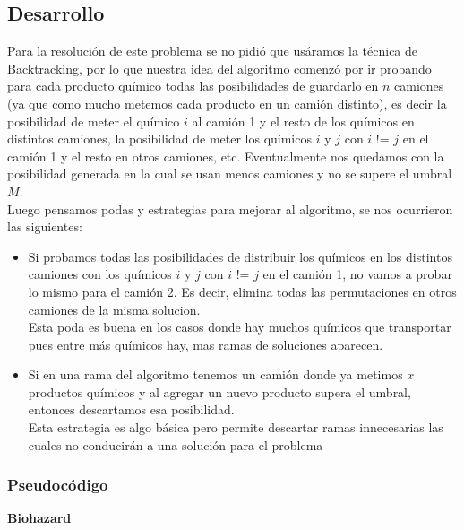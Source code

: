 \subsection{Desarrollo}


Para la resolución de este problema se no pidió que usáramos la técnica de Backtracking, por lo que nuestra idea del algoritmo comenzó por ir probando para cada producto químico todas las posibilidades de guardarlo en $n$ camiones (ya que como mucho metemos cada producto en un camión distinto), es decir la posibilidad de meter el químico $i$ al camión 1 y el resto de los químicos en distintos camiones, la posibilidad de meter los químicos $i$ y $j$ con $i$ != $j$ en el camión 1 y el resto en otros camiones, etc. Eventualmente nos quedamos con la posibilidad generada en la cual se usan menos camiones y no se supere el umbral $M$. \\
Luego pensamos podas y estrategias para mejorar al algoritmo, se nos ocurrieron las siguientes: 

\begin{itemize}
	\item Si probamos todas las posibilidades de distribuir los químicos en los distintos camiones con los químicos $i$ y $j$ con $i$ != $j$ en el camión 1, no vamos a probar lo mismo para el camión 2. Es decir, elimina todas las permutaciones en otros camiones de la misma solucion. \\
	Esta poda es buena en los casos donde hay muchos químicos que transportar pues entre más químicos hay, mas ramas de soluciones aparecen.
	
	\item Si en una rama del algoritmo tenemos un camión donde ya metimos $x$ productos químicos y al agregar un nuevo producto supera el umbral, entonces descartamos esa posibilidad. \\
	Esta estrategia es algo básica pero permite descartar ramas innecesarias las cuales no conducirán a una solución para el problema
 
\end{itemize}


\subsubsection{Pseudocódigo}

\LinesNumbered
\begin{algorithm}[H]
\DontPrintSemicolon
{}
\caption{\textbf{Biohazard } \label{Biohazard }}
\end{algorithm}

